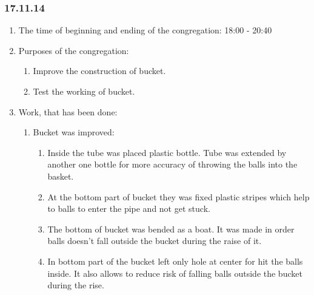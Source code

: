 
\subsubsection{17.11.14}

\begin{enumerate} 
	\item The time of beginning and ending of the congregation:
	18:00 - 20:40
	\item Purposes of the congregation:
	\begin{enumerate}
		\item Improve the construction of bucket.
		
		\item Test the working of bucket.
		
	\end{enumerate}
	
	\item Work, that has been done:
	\begin{enumerate}
		\item Bucket was improved:
		\begin{enumerate}
			\item Inside the tube was placed plastic bottle. Tube was extended by another one bottle for more accuracy of throwing the balls into the basket.
			
			\item At the bottom part of bucket they was fixed plastic stripes which help to balls to enter the pipe and not get stuck.
			
			\item The bottom of bucket was bended as a boat. It was made in order balls doesn't fall outside the bucket during the raise of it.
			
			\item In bottom part of the bucket left only hole at center for hit the balls inside. It also allows to reduce risk of falling balls outside the bucket during the rise.
			
		\end{enumerate}
		

\end{enumerate}
\end{enumerate}
